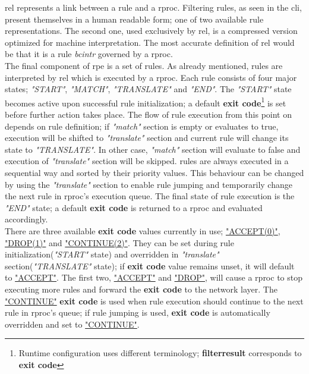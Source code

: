 \documentclass[a4paper,latin]{paper}
\begin{document}
\acrlong{rel} represents a link between a \gls{rule} and a \acrlong{rproc}. Filtering \glspl{rule}, as seen in the \acrfull{cli}, present themselves in a human readable form; 
one of two available \gls{rule} representations. The second one, used exclusively by \acrlong{rel}, is a compressed version optimized for machine interpretation. The most accurate 
definition of \acrfull{rel} would be that it is a \gls{rule} \textit{\gls{bcintr}} governed by a \acrfull{rproc}.\\

The final component of \acrlong{rpe} is a set of \glspl{rule}. As already mentioned, \glspl{rule} are interpreted by \acrfull{rel} which is executed by a \acrfull{rproc}. 
Each \gls{rule} consists of four major states; \textit{"START"}, \textit{"MATCH"}, \textit{"TRANSLATE"} and \textit{"END"}. The \textit{"START"} state becomes active upon successful 
\gls{rule} initialization; a default \textbf{exit code}\footnote{Runtime configuration uses different terminology; \textbf{filter\textunderscore{}result} corresponds to \textbf{exit code}} is set before 
further action takes place. The flow of \gls{rule} execution from this point on depends on \gls{rule} definition; if \textit{"match"} section is empty or evaluates to true, execution 
will be shifted to \textit{"translate"} section and current \gls{rule} will change its state to \textit{"TRANSLATE"}. In other case, \textit{"match"} section will evaluate to false 
and execution of \textit{"translate"} section will be skipped. \Glspl{rule} are always executed in a sequential way and sorted by their priority values. This behaviour can be changed 
by using the \textit{"translate"} section to enable \gls{rule} jumping and temporarily change the next \gls{rule} in \acrlong{rproc}'s execution queue. The final state of \gls{rule} 
execution is the \textit{"END"} state; a default \textbf{exit code} is returned to a \acrlong{rproc} and evaluated accordingly.\\

There are three available \textbf{exit code} values currently in use; \underline{"ACCEPT(0)"}, \underline{"DROP(1)"} and \underline{"CONTINUE(2)"}. They can be set during \gls{rule} 
initialization(\textit{"START"} state) and overridden in \textit{"translate"} section(\textit{"TRANSLATE"} state); if \textbf{exit code} value remains unset, it will default to \underline{"ACCEPT"}.
The first two, \underline{"ACCEPT"} and \underline{"DROP"}, will cause a \acrlong{rproc} to stop executing more \glspl{rule} and forward the \textbf{exit code} to the network layer. 
The \underline{"CONTINUE"} \textbf{exit code} is used when \gls{rule} execution should continue to the next \gls{rule} in \acrlong{rproc}'s queue; if \gls{rule} jumping is used, \textbf{exit code} 
is automatically overridden and set to \underline{"CONTINUE"}.\\
\end{document}
